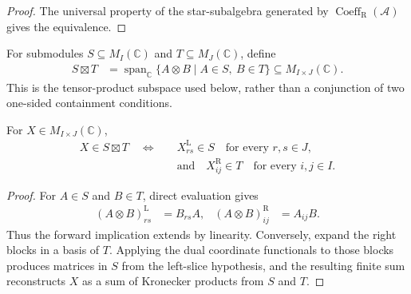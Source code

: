 \begin{proof}\leanok
    The universal property of the star-subalgebra generated by
    $\operatorname{Coeff}_{\mathrm R}(\mathcal A)$ gives the equivalence.
\end{proof}

\begin{definition}
    \label{def:qca_kronecker_submodule}
    \leanok
    For submodules $S\subseteq M_I(\mathbb C)$ and
    $T\subseteq M_J(\mathbb C)$, define
    \begin{align}
        S\boxtimes T
         & =\operatorname{span}_{\mathbb C}
        \{A\otimes B\mid A\in S,\ B\in T\}
        \subseteq M_{I\times J}(\mathbb C).
    \end{align}
    This is the tensor-product subspace used below, rather than a
    conjunction of two one-sided containment conditions.
\end{definition}

\begin{lemma}
    \label{thm:qca_mem_kronecker_submodule_iff}
    \leanok
    For $X\in M_{I\times J}(\mathbb C)$,
    \begin{align}
        X\in S\boxtimes T
        \quad\Longleftrightarrow\quad
         & X^{\mathrm L}_{rs}\in S
        \quad\text{for every }r,s\in J, \\
         & \text{and}\quad
        X^{\mathrm R}_{ij}\in T
        \quad\text{for every }i,j\in I.
    \end{align}
\end{lemma}

\begin{proof}\leanok
    For $A\in S$ and $B\in T$, direct evaluation gives
    \begin{align}
        (A\otimes B)^{\mathrm L}_{rs} & =B_{rs}A, &
        (A\otimes B)^{\mathrm R}_{ij} & =A_{ij}B.
    \end{align}
    Thus the forward implication extends by linearity.
    Conversely, expand the right blocks in a basis of $T$.  Applying the dual
    coordinate functionals to those blocks produces matrices in $S$ from the
    left-slice hypothesis, and the resulting finite sum reconstructs $X$ as a
    sum of Kronecker products from $S$ and $T$.
\end{proof}

